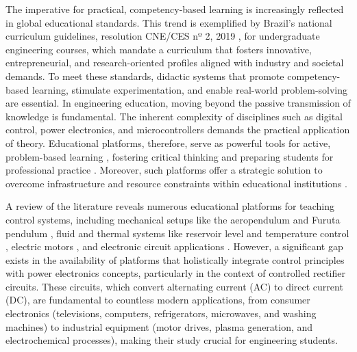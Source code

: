 \documentclass[english]{textolivre}
\begin{document}
The imperative for practical, competency-based learning is increasingly reflected in global educational standards. This trend is exemplified by Brazil's national curriculum guidelines, resolution CNE/CES nº 2, 2019 \cite{brasil2019dcnsengenharia}, for undergraduate engineering courses, which mandate a curriculum that fosters innovative, entrepreneurial, and research-oriented profiles aligned with industry and societal demands. To meet these standards, didactic systems that promote competency-based learning, stimulate experimentation, and enable real-world problem-solving are essential. In engineering education, moving beyond the passive transmission of knowledge is fundamental. The inherent complexity of disciplines such as digital control, power electronics, and microcontrollers demands the practical application of theory. Educational platforms, therefore, serve as powerful tools for active, problem-based learning \cite{souza2015aprendizagem}, fostering critical thinking and preparing students for professional practice \cite{mann2021problem,chen2021forms}. Moreover, such platforms offer a strategic solution to overcome infrastructure and resource constraints within educational institutions \cite{pugliese2022modeling}.

A review of the literature reveals numerous educational platforms for teaching control systems, including mechanical setups like the aeropendulum and Furuta pendulum  \cite{neto2023aeropendulum,breganon2021desenvolvimento,cavazzana2011construccao}, fluid and thermal systems like reservoir level and temperature control \cite{pugliese2022modeling,candelas2015experiences},  electric motors \cite{normey2024teaching}, and electronic circuit applications \cite{lopez2025tuning,sotelo2022lab,chinelato2022experimental,keles2017modulos}. However, a significant gap exists in the availability of platforms that holistically integrate control principles with power electronics concepts, particularly in the context of controlled rectifier circuits. These circuits, which convert alternating current (AC) to direct current (DC), are fundamental to countless modern applications, from consumer electronics (televisions, computers, refrigerators, microwaves, and washing machines) to industrial equipment (motor drives, plasma generation, and electrochemical processes), making their study crucial for engineering students.
\end{document}
